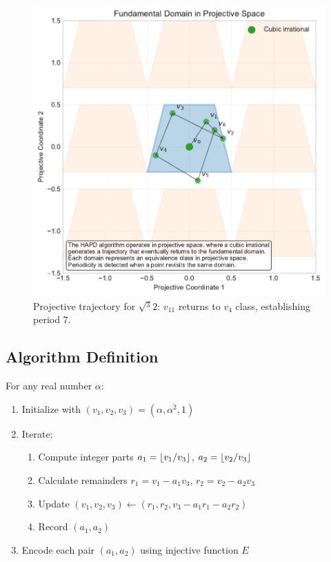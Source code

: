 \begin{figure}[htbp]
\begin{minipage}{\textwidth}
\centering
\includegraphics[width=\textwidth]{figures/projective_space_regions.pdf}
\caption{Projective trajectory for $\sqrt{^3}{2}$: $v_{11}$ returns to $v_4$ class, establishing period 7.}
\label{fig:projective_trajectory}
\end{minipage}
\end{figure}

\subsection{Algorithm Definition}

\begin{algorithm_def}\label{alg:hapd}
For any real number $\alpha$:
\begin{enumerate}
    \item Initialize with $(v_1, v_2, v_3) = (\alpha, \alpha^2, 1)$
    \item Iterate:
    \begin{enumerate}
        \item Compute integer parts $a_1 = \lfloor v_1/v_3 \rfloor$, $a_2 = \lfloor v_2/v_3 \rfloor$
        \item Calculate remainders $r_1 = v_1 - a_1v_3$, $r_2 = v_2 - a_2v_3$
        \item Update $(v_1, v_2, v_3) \leftarrow (r_1, r_2, v_3 - a_1r_1 - a_2r_2)$
        \item Record $(a_1, a_2)$
    \end{enumerate}
    \item Encode each pair $(a_1, a_2)$ using injective function $E$
\end{enumerate}
\end{algorithm_def}

